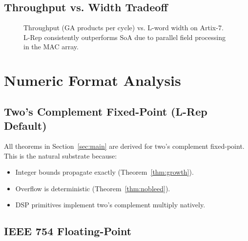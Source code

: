 \documentclass[11pt,a4paper]{article}
\theoremstyle{definition}
\theoremstyle{plain}
\theoremstyle{remark}
\begin{document}
\subsection{Throughput vs. Width Tradeoff}

\begin{figure}[h]
\centering
{}
\caption{Throughput (GA products per cycle) vs. L-word width on Artix-7.  L-Rep consistently outperforms SoA due to parallel field processing in the MAC array.}
\label{fig:throughput}
\end{figure}

\section{Numeric Format Analysis}
\label{sec:numformat}

\subsection{Two's Complement Fixed-Point (L-Rep Default)}

All theorems in Section~\ref{sec:main} are derived for two's complement fixed-point.  This is the natural substrate because:
\begin{itemize}
  \item Integer bounds propagate exactly (Theorem~\ref{thm:growth}).
  \item Overflow is deterministic (Theorem~\ref{thm:nobleed}).
  \item DSP primitives implement two's complement multiply natively.
\end{itemize}

\subsection{IEEE 754 Floating-Point}
\end{document}
